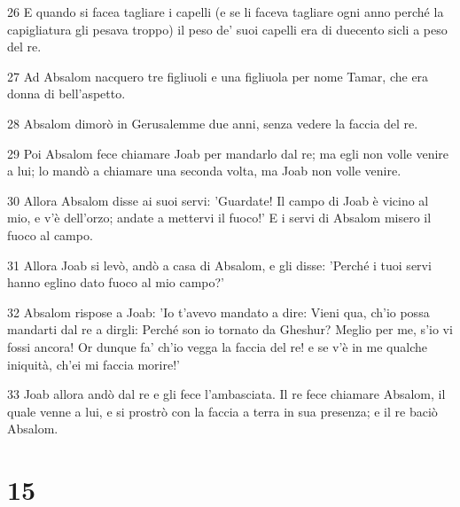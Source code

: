 \par 26 E quando si facea tagliare i capelli (e se li faceva tagliare ogni anno perché la capigliatura gli pesava troppo) il peso de' suoi capelli era di duecento sicli a peso del re.
\par 27 Ad Absalom nacquero tre figliuoli e una figliuola per nome Tamar, che era donna di bell'aspetto.
\par 28 Absalom dimorò in Gerusalemme due anni, senza vedere la faccia del re.
\par 29 Poi Absalom fece chiamare Joab per mandarlo dal re; ma egli non volle venire a lui; lo mandò a chiamare una seconda volta, ma Joab non volle venire.
\par 30 Allora Absalom disse ai suoi servi: 'Guardate! Il campo di Joab è vicino al mio, e v'è dell'orzo; andate a mettervi il fuoco!' E i servi di Absalom misero il fuoco al campo.
\par 31 Allora Joab si levò, andò a casa di Absalom, e gli disse: 'Perché i tuoi servi hanno eglino dato fuoco al mio campo?'
\par 32 Absalom rispose a Joab: 'Io t'avevo mandato a dire: Vieni qua, ch'io possa mandarti dal re a dirgli: Perché son io tornato da Gheshur? Meglio per me, s'io vi fossi ancora! Or dunque fa' ch'io vegga la faccia del re! e se v'è in me qualche iniquità, ch'ei mi faccia morire!'
\par 33 Joab allora andò dal re e gli fece l'ambasciata. Il re fece chiamare Absalom, il quale venne a lui, e si prostrò con la faccia a terra in sua presenza; e il re baciò Absalom.

\chapter{15}

